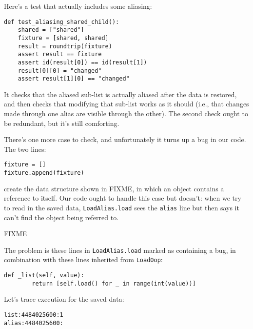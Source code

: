 \documentclass{scrbook}
\begin{document}
Here's a test that actually includes some aliasing:


\begin{lstlisting}[frame=single,frameround=tttt]
def test_aliasing_shared_child():
    shared = ["shared"]
    fixture = [shared, shared]
    result = roundtrip(fixture)
    assert result == fixture
    assert id(result[0]) == id(result[1])
    result[0][0] = "changed"
    assert result[1][0] == "changed"
\end{lstlisting}



\noindent It checks that the aliased sub-list is actually aliased after the data is restored,
and then checks that modifying that sub-list works as it should
(i.e.,
that changes made through one alias are visible through the other).
The second check ought to be redundant,
but it's still comforting.


There's one more case to check,
and unfortunately it turns up a bug in our code.
The two lines:

\begin{lstlisting}[frame=single,frameround=tttt]
fixture = []
fixture.append(fixture)
\end{lstlisting}


\noindent create the data structure shown in FIXME,
in which an object contains a reference to itself.
Our code ought to handle this case but doesn't:
when we try to read in the saved data,
\texttt{LoadAlias.load} sees the \texttt{alias} line
but then says it can't find the object being referred to.


FIXME


\noindent The problem is these lines in \texttt{LoadAlias.load}
marked as containing a bug,
in combination with these lines inherited from \texttt{LoadOop}:


\begin{lstlisting}[frame=single,frameround=tttt]
    def _list(self, value):
        return [self.load() for _ in range(int(value))]
\end{lstlisting}



\noindent Let's trace execution for the saved data:

\begin{lstlisting}[frame=single,frameround=tttt]
list:4484025600:1
alias:4484025600:
\end{lstlisting}
\end{document}

